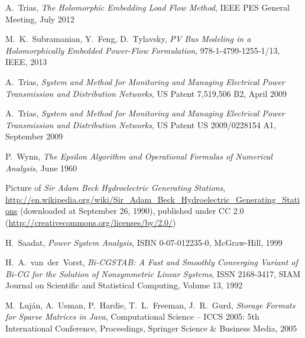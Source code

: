 \begin{thebibliography}{1}
	A.~Trias, \emph{The Holomorphic Embedding Load Flow Method}, IEEE PES General Meeting, July 2012
	
	M.~K.~Subramanian, Y.~Feng, D.~Tylavsky, \emph{PV Bus Modeling in a Holomorphically Embedded Power-Flow Formulation}, 978-1-4799-1255-1/13, IEEE, 2013
	
	A.~Trias, \emph{System and Method for Monitoring and Managing Electrical Power Transmission and Distribution Networks}, US Patent 7,519,506 B2, April 2009
	
	A.~Trias, \emph{System and Method for Monitoring and Managing Electrical Power Transmission and Distribution Networks}, US Patent US 2009/0228154 A1, September 2009
				
	P.~Wynn, \emph{The Epsilon Algorithm and Operational Formulas of Numerical Analysis}, June 1960	
	
	Picture of \emph{Sir Adam Beck Hydroelectric Generating Stations}, \url{http://en.wikipedia.org/wiki/Sir_Adam_Beck_Hydroelectric_Generating_Stations} (downloaded at September 26, 1990), published under CC 2.0 (\url{http://creativecommons.org/licenses/by/2.0/})
	
	H.~Saadat, \emph{Power System Analysis}, ISBN 0-07-012235-0, McGraw-Hill, 1999
	
	H.~A.~van~der~Vorst, \emph{Bi-CGSTAB: A Fast and Smoothly Converging Variant of Bi-CG for the Solution of Nonsymmetric Linear Systems}, ISSN 2168-3417, SIAM Journal on Scientific and Statistical Computing, Volume 13, 1992
	
	M.~Luján, A.~Usman, P.~Hardie, T.~L.~Freeman, J.~R.~Gurd, \emph{Storage Formats for Sparse Matrices in Java}, Computational Science -- ICCS 2005: 5th International Conference, Proceedings, Springer Science \& Business Media, 2005
\end{thebibliography}